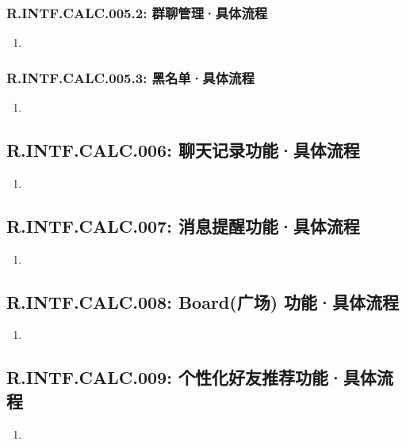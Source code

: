         \subsubsection{R.INTF.CALC.005.2: 群聊管理·具体流程}
        \begin{enumerate}
            \item 
        \end{enumerate}
        \subsubsection{R.INTF.CALC.005.3: 黑名单·具体流程}
        \begin{enumerate}
            \item 
        \end{enumerate}
    \subsection{R.INTF.CALC.006: 聊天记录功能·具体流程}
    \begin{enumerate}
        \item 
    \end{enumerate}
    \subsection{R.INTF.CALC.007: 消息提醒功能·具体流程}
    \begin{enumerate}
        \item 
    \end{enumerate}
    \subsection{R.INTF.CALC.008: Board(广场) 功能·具体流程}
    \begin{enumerate}
        \item 
    \end{enumerate}
    \subsection{R.INTF.CALC.009: 个性化好友推荐功能·具体流程}
    \begin{enumerate}
        \item 
    \end{enumerate}
